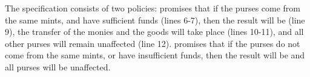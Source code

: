 




The specification %
 consists of two policies:  %
promises that if the purses come from the same mints, and have
sufficient funds (lines 6-7), then the result will be  (line
9), the transfer of the monies and the goods will take place (lines
10-11), and all other purses will remain unaffected (line 12).  %
promises that if the purses do not come from the same mints, or have
insufficient funds, then the result will be 
and all purses will be unaffected.




